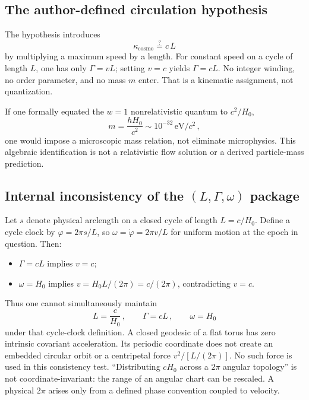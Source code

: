 \documentclass[aps,prd,reprint,superscriptaddress,nofootinbib,floatfix,showkeys]{revtex4-2}
\newcommand{\Hzero}{H_{0}}
\begin{document}
\subsection{The author-defined circulation hypothesis}

The hypothesis introduces
\begin{equation}
  \kappa_{\mathrm{cosmo}} \stackrel{?}{=} c\,L
  \label{eq:fake-kappa}
\end{equation}
by multiplying a maximum speed by a length.  For constant speed on a cycle of
length \(L\), one has only \(\Gamma=vL\); setting \(v=c\) yields \(\Gamma=cL\).
No integer winding, no order parameter, and no mass \(m\) enter.  That is a
kinematic assignment, not quantization.

If one formally equated the \(w=1\) nonrelativistic quantum to \(c^{2}/\Hzero\),
\begin{equation}
  m = \frac{h\Hzero}{c^{2}}
  \sim 10^{-32}\,\mathrm{eV}/c^{2}\,,
  \label{eq:mass-pred}
\end{equation}
one would impose a microscopic mass relation, not eliminate microphysics.
This algebraic identification is not a relativistic flow solution or a
derived particle-mass prediction.

\subsection{Internal inconsistency of the \texorpdfstring{\((L,\Gamma,\omega)\)}{(L, Gamma, omega)} package}

Let \(s\) denote physical arclength on a closed cycle of length
\(L=c/\Hzero\). Define a cycle clock by
\(\varphi=2\pi s/L\), so \(\omega=\dot\varphi=2\pi v/L\) for uniform
motion at the epoch in question. Then:
\begin{itemize}
\item \(\Gamma=cL\) implies \(v=c\);
\item \(\omega=\Hzero\) implies
  \(v=\Hzero L/(2\pi)=c/(2\pi)\), contradicting \(v=c\).
\end{itemize}
Thus one cannot simultaneously maintain
\begin{equation}
  L=\frac{c}{\Hzero}\,,
  \qquad
  \Gamma=cL\,,
  \qquad
  \omega=\Hzero
  \label{eq:inconsistent}
\end{equation}
under that cycle-clock definition. A closed geodesic of a flat torus has
zero intrinsic covariant acceleration. Its periodic coordinate does not
create an embedded circular orbit or a centripetal force \(v^2/[L/(2\pi)]\).
No such force is used in this consistency test. ``Distributing \(c\Hzero\) across a
\(2\pi\) angular topology'' is not coordinate-invariant: the range of an
angular chart can be rescaled.  A physical \(2\pi\) arises only from a defined
phase convention coupled to velocity.
\end{document}

